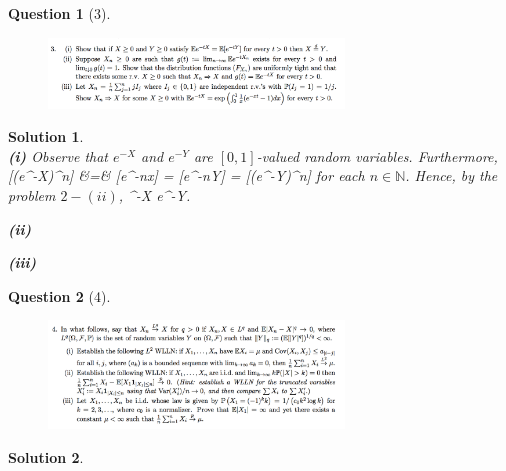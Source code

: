 \documentclass{article} %
\def\eQb#1\eQe{\begin{eqnarray*}#1\end{eqnarray*}}
\newcommand\eqD{\stackrel{\mathclap{\normalfont\mbox{d}}}{=}}
\theoremstyle{quest}
\newtheorem*{question}{Question}
\newtheorem*{solution}{Solution}
\begin{document}
\newpage

\begin{question}[3]
\hfill
\begin{figure}[h!]
  \centering
    \includegraphics[width=0.7\textwidth]{prob-e5-p3.png}
\end{figure}
\end{question}
\begin{solution} \hfill \\
\textbf{(i)}
Observe that $e^{-X}$ and $e^{-Y}$ are $[0,1]$-valued random variables. Furthermore,
\eQb
\mathbb{E}[(e^{-X})^n] &=& [e^{-nx}] = [e^{-nY}] = 
[(e^{-Y})^n] 
\eQe 
for each $n \in \mathbb{N}$. Hence, by the problem $2-(ii)$, 
\eQb
e^{-X} \eqD e^{-Y}.
\eQe

\bigskip

\textbf{(ii)}

\textbf{(iii)}

\end{solution}

\newpage

\begin{question}[4]
\hfill
\begin{figure}[h!]
  \centering
    \includegraphics[width=0.7\textwidth]{prob-e5-p4.png}
\end{figure}
\end{question}
\begin{solution} \hfill \\
\end{solution}
\end{document}
